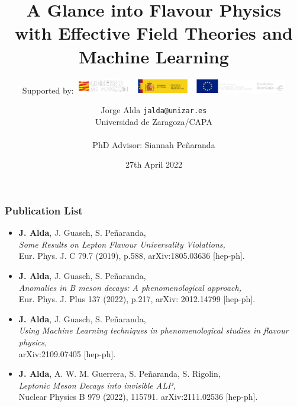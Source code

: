 \documentclass[mathserif, 10pt, dvipsnames]{beamer}
\title[A Glance into Flavour Physics...]{A Glance into Flavour Physics \\with Effective Field Theories and Machine Learning}
\author[Jorge Alda]{Jorge Alda \hspace{6em} \texttt{jalda@unizar.es} \\ Universidad de Zaragoza/CAPA\\~\\
    \scriptsize{PhD Advisor: Siannah Peñaranda} }
\date[PhD Thesis]{27th April 2022}
\subtitle{Supported by:\hspace{0.4cm} \includegraphics[width=0.7\textwidth]{logos/financ.png}}
\begin{document}
\begin{frame}

\titlepage

\end{frame}

\begin{frame}\frametitle{Publication List}

\begin{itemize}\color{red}
\item \textbf{J. Alda}, J. Guasch, S. Peñaranda,\\
              \textit{Some Results on Lepton Flavour Universality Violations,}\\
              Eur. Phys. J. C 79.7 (2019), p.588, arXiv:1805.03636 [hep-ph].
\item \textbf{J. Alda}, J. Guasch, S. Peñaranda, \\\textit{Anomalies in B meson decays: A phenomenological approach,}\\
              Eur. Phys. J. Plus 137 (2022), p.217, arXiv: 2012.14799 [hep-ph].
\item \textbf{J. Alda}, J. Guasch, S. Peñaranda,\\
              \textit{Using Machine Learning techniques in phenomenological studies in flavour physics,}\\
              arXiv:2109.07405 [hep-ph].
\item \textbf{J. Alda}, A. W. M. Guerrera, S. Peñaranda, S. Rigolin,\\
              \textit{Leptonic Meson Decays into invisible ALP,}\\
Nuclear Physics B 979 (2022), 115791. arXiv:2111.02536 [hep-ph].
    \end{itemize}

\end{frame}
\end{document}
